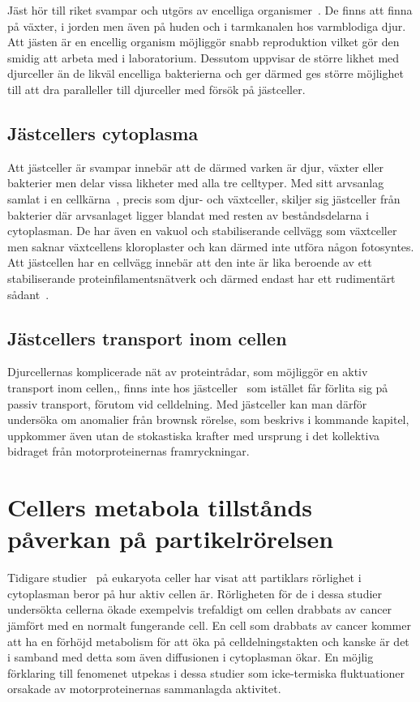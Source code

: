 Jäst hör till riket svampar och utgörs av encelliga organismer~\cite{SGD_yeast}.
De finns att finna på växter, i jorden men även på huden och i tarmkanalen hos varmblodiga djur. 
Att jästen är en encellig organism möjliggör snabb reproduktion vilket gör den smidig att arbeta med i laboratorium. Dessutom uppvisar de större likhet med djurceller än de likväl encelliga bakterierna och ger därmed ges större möjlighet till att dra paralleller till djurceller med försök på jästceller. 

\subsection{Jästcellers cytoplasma}
Att jästceller är svampar innebär att de därmed varken är djur, växter eller bakterier men delar vissa likheter med alla tre celltyper. Med sitt arvsanlag samlat i en cellkärna~\cite{SGD_yeast}, precis som djur- och växtceller, skiljer sig jästceller från bakterier där arvsanlaget ligger blandat med resten av beståndsdelarna i cytoplasman.
De har även en vakuol och stabiliserande cellvägg som växtceller men saknar växtcellens kloroplaster och kan därmed inte utföra någon fotosyntes. Att jästcellen har en cellvägg innebär att den inte är lika beroende av ett stabiliserande proteinfilamentsnätverk och därmed endast har ett rudimentärt sådant~\cite{Midtveldt_etal2016}.

\subsection{Jästcellers transport inom cellen}
Djurcellernas komplicerade nät av proteintrådar, som möjliggör en aktiv transport inom cellen,, finns inte hos jästceller~\cite{Midtveldt_etal2016} som istället får förlita sig på passiv transport, förutom vid celldelning. 
Med jästceller kan man därför undersöka om anomalier från brownsk rörelse, som beskrivs i kommande kapitel, uppkommer även utan de stokastiska krafter med ursprung i det kollektiva bidraget från motorproteinernas framryckningar.


\section{Cellers metabola tillstånds påverkan på partikelrörelsen}
Tidigare studier~\cite{Gou_etal2014} på eukaryota celler har visat att
partiklars rörlighet i cytoplasman beror på hur aktiv cellen
är. Rörligheten för de i dessa studier undersökta cellerna ökade exempelvis
trefaldigt om cellen drabbats av cancer jämfört med en normalt
fungerande cell. En cell som drabbats av cancer kommer att ha en förhöjd metabolism\cite{Gou_etal2014} för att öka på celldelningstakten och kanske är det i samband med detta som även diffusionen i cytoplasman ökar. En möjlig förklaring till fenomenet utpekas i dessa studier som icke-termiska fluktuationer orsakade av motorproteinernas sammanlagda aktivitet.

